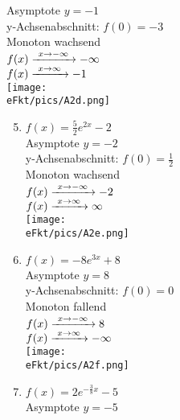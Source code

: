 \begin{Answer}[ref=eFktA2]
\begin{minipage}{\textwidth}
\begin{minipage}[t]{0.49\textwidth}
\begin{enumerate}[label=\alph*)]
				Asymptote \(y=-1\)\\
				y-Achsenabschnitt: \(f(0)=-3\)\\
				Monoton wachsend\\
				\(f(x)\xrightarrow{\hphantom{\ }x\to-\infty\hphantom{\ }}-\infty\)\\
				\(f(x)\xrightarrow{\hphantom{\ }x\to\infty\hphantom{\ }}-1\)\\
				\texttt{[image: \\eFkt/pics/A2d.png]}
			\end{enumerate}
		\end{minipage}
	\end{minipage}
	\newpage
	\begin{minipage}{\textwidth}
		\begin{minipage}[t]{0.49\textwidth}
			\begin{enumerate}[label=\alph*)]
				\setcounter{enumi}{4}
				\item \(f(x)=\frac{5}{2}e^{2x}-2\)\\
				Asymptote \(y=-2\)\\
				y-Achsenabschnitt: \(f(0)=\frac{1}{2}\)\\
				Monoton wachsend\\
				\(f(x)\xrightarrow{\hphantom{\ }x\to-\infty\hphantom{\ }}-2\)\\
				\(f(x)\xrightarrow{\hphantom{\ }x\to\infty\hphantom{\ }}\infty\)\\
				\texttt{[image: \\eFkt/pics/A2e.png]}
				\item \(f(x)=-8e^{3x}+8\)\\
				Asymptote \(y=8\)\\
				y-Achsenabschnitt: \(f(0)=0\)\\
				Monoton fallend\\
				\(f(x)\xrightarrow{\hphantom{\ }x\to-\infty\hphantom{\ }}8\)\\
				\(f(x)\xrightarrow{\hphantom{\ }x\to\infty\hphantom{\ }}-\infty\)\\
				\texttt{[image: \\eFkt/pics/A2f.png]}
			\end{enumerate}
		\end{minipage}
		\begin{minipage}[t]{0.49\textwidth}
			\begin{enumerate}[label=\alph*)]
				\setcounter{enumi}{6}
				\item \(f(x)=2e^{-\frac{3}{8}x}-5\)\\
				Asymptote \(y=-5\)\\

\end{enumerate}
\end{minipage}
\end{minipage}
\end{Answer}
